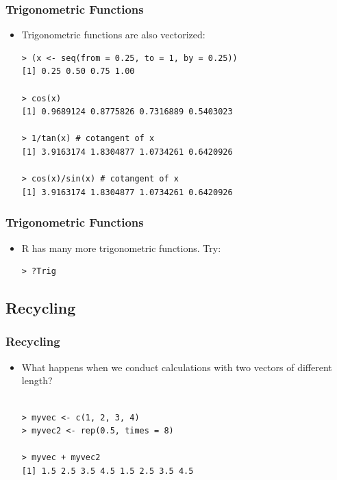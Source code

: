 \documentclass[xcolor=dvipsnames, xcolor=table]{beamer} %
\theoremstyle{mystyle}
\begin{document}
\begin{frame}[fragile]
\frametitle{Trigonometric Functions}

\begin{itemize}

\item Trigonometric functions are also vectorized:

\begin{verbatim}
> (x <- seq(from = 0.25, to = 1, by = 0.25))
[1] 0.25 0.50 0.75 1.00

> cos(x)
[1] 0.9689124 0.8775826 0.7316889 0.5403023

> 1/tan(x) # cotangent of x
[1] 3.9163174 1.8304877 1.0734261 0.6420926

> cos(x)/sin(x) # cotangent of x
[1] 3.9163174 1.8304877 1.0734261 0.6420926
\end{verbatim}

\end{itemize}

\end{frame}

\begin{frame}[fragile]
\frametitle{Trigonometric Functions}

\begin{itemize}

\item R has many more trigonometric functions. Try:

\begin{verbatim}
> ?Trig
\end{verbatim}

\end{itemize}

\end{frame}

\subsection{Recycling}


\begin{frame}[fragile]
\frametitle{Recycling}
\begin{itemize}

\item What happens when we conduct calculations with two vectors of different length?
\begin{verbatim}

> myvec <- c(1, 2, 3, 4) 
> myvec2 <- rep(0.5, times = 8)

> myvec + myvec2
[1] 1.5 2.5 3.5 4.5 1.5 2.5 3.5 4.5

\end{verbatim}
\end{itemize}

\end{frame}
\end{document}
